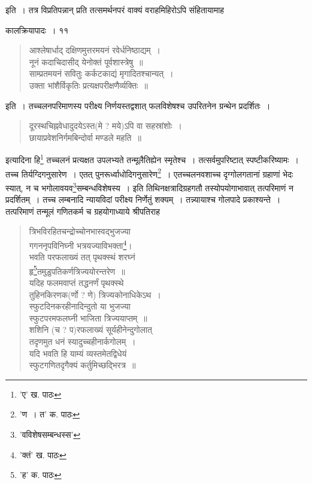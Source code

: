 \documentclass[11pt, openany]{book}
\begin{document}
\noindent इति~। तत्र विप्रतिपन्नान् प्रति तत्समर्थनपरं वाक्यं वराहमिहिरोऽपि संहितायामाह\textendash 

\newpage

\vspace{3cm} \hspace{4cm}कालक्रियापादः~।\hspace{4cm} ११

\vspace{0.3cm}
\begin{quote}
{\qt आश्लेषार्धाद् दक्षिणमुत्तरमयनं रवेर्धनिष्ठाद्यम्~।\\
    नूनं कदाचिदासीद् येनोक्तं पूर्वशास्त्रेषु~॥\\
साम्प्रतमयनं सवितुः कर्कटकाद्यं मृगादितश्चान्यत्~।\\
उक्ता भांशैर्विकृतिः प्रत्यक्षपरीक्षणैर्व्यक्तिः~॥}
\end{quote}

\noindent इति~। तच्चलनपरिमाणस्य परीक्ष्य निर्णयस्तद्वशात् फलविशेषश्च उपरितनेन ग्रन्थेन प्रदर्शितः~। 

\begin{quote}
{\qt दूरस्थचिह्नवेधादुदयेऽस्त(मे ? मये)ऽपि वा सहस्रांशोः~।\\
छायाप्रवेशनिर्गमबिन्दोर्वा मण्डले महति~॥}
\end{quote}
\noindent इत्यादिना हि\renewcommand{\thefootnote}{१}\footnote{'ए' ख. पाठः} तच्चलनं प्रत्यक्षत उपलभ्यते तन्मूलैतिह्येन स्मृतेश्च~। तत्सर्वमुपरिष्टात् स्पष्टीकरिष्यामः~। तच्च तिर्यग्दिगनुसारेण~। एतत् पुनरूर्ध्वाधोदिगनुसारेण\renewcommand{\thefootnote}{२}\footnote{'ण~। त' क. पाठः}~। एतच्चलनवशाच्च दृग्गोलगतानां ग्रहाणां भेदः स्यात्, न च भगोलावयव\renewcommand{\thefootnote}{३}\footnote{'वविशेषसम्बन्धस्स'}सम्बन्धविशेषस्य~। इति तिथिनक्षत्रादिग्रहगतौ तस्योपयोगाभावात् तत्परिमाणं न प्रदर्शितम्~। तच्च लम्बनादि न्यायविदां परीक्ष्य
निर्णेतुं शक्यम्~। तन्न्यायाश्च गोलपादे प्रकाश्यन्ते~। तत्परिमाणं तन्मूलं गणितकर्म च ग्रहयोगाध्याये श्रीपतिराह\textendash

\begin{quote}
{\qt त्रिभविरहितचन्द्रोच्चोनभास्वद्भुजज्या\\
गगननृपविनिघ्नी भत्रयज्याविभक्ता\renewcommand{\thefootnote}{४}\footnote{'क्तं' ख. पाठः}।\\
भवति परफलाख्यं तत् पृथक्स्थं शरघ्नं\\
हृ\renewcommand{\thefootnote}{५}\footnote{'ह' क. पाठः}तमुडुपतिकर्णत्रिज्ययोरन्तरेण~॥\\
यदिह फलमवाप्तं तद्धनर्णं पृथक्स्थे\\
तुहिनकिरणक(र्णो ? णे) त्रिज्यकोनाधिकेऽथ~।\\
स्फुटदिनकरहीनादिन्दुतो या भुजज्या\\
स्फुटपरमफलघ्नी भाजिता त्रिज्ययाप्तम्~॥\\
शशिनि (च ? प)रफलाख्यं सूर्यहीनेन्दुगोलात्\\
तदृणमुत धनं स्यादुच्चहीनार्कगोलम्~।\\
यदि भवति हि याम्यं व्यस्तमेतद्विधेयं\\
स्फुटगणितदृगैक्यं कर्तुमिच्छद्भिरत्र~॥}
\end{quote}
  
\end{document}
